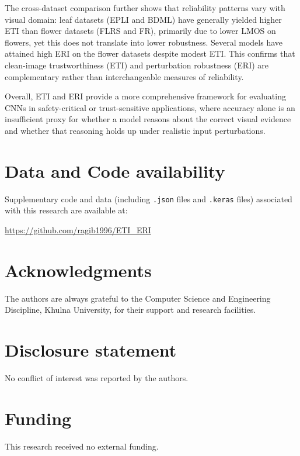 \documentclass[a4paper,fleqn]{cas-dc}
\begin{document}
	The cross-dataset comparison further shows that reliability patterns vary with visual domain: leaf datasets (EPLI and BDML) have generally yielded higher ETI than flower datasets (FLRS and FR), primarily due to lower LMOS on flowers, yet this does not translate into lower robustness. 
	Several models have attained high ERI on the flower datasets despite modest ETI. 
	This confirms that clean-image trustworthiness (ETI) and perturbation robustness (ERI) are complementary rather than interchangeable measures of reliability.
	
	Overall, ETI and ERI provide a more comprehensive framework for evaluating CNNs in safety-critical or trust-sensitive applications, where accuracy alone is an insufficient proxy for whether a model reasons about the correct visual evidence and whether that reasoning holds up under realistic input perturbations.
	
	
	\section*{Data and Code availability}
	
	Supplementary code and data (including \texttt{.json} files and
	\texttt{.keras} files) associated with this research are available at:
	
	\url{https://github.com/ragib1996/ETI_ERI}
	
	\printcredits
	
	
	\section*{Acknowledgments}
    The authors are always grateful to the Computer Science
and Engineering Discipline, Khulna University, for their
support and research facilities.
	
	\section*{Disclosure statement}
    No conflict of interest was reported by the authors.
	
	\section*{Funding}
	This research received no external funding. 
	
	
	
	
	
\end{document}
